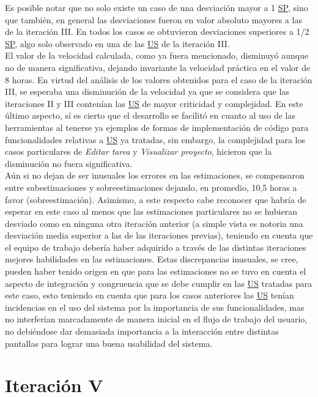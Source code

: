 \documentclass[a4paper, 12pt,twoside]{report}  %
\numberwithin{equation}{subsection} %
\begin{document}
\indent Es posible notar que no solo existe un caso de una desviación mayor a 1 \hyperlink{SP}{SP}, sino que también, en general las desviaciones fueron en valor absoluto mayores a las de la iteración III. En todos los casos se obtuvieron desviaciones superiores a 1/2 \hyperlink{SP}{SP}, algo solo observado en una de las \hyperlink{US}{US} de la iteración III.\\
\indent El valor de la velocidad calculada, como ya fuera mencionado, disminuyó aunque no de manera significativa, dejando invariante la velocidad práctica en el valor de 8 horas. En virtud del análisis de los valores obtenidos para el caso de la iteración III, se esperaba una disminución de la velocidad ya que se considera que las iteraciones II y III contenían las \hyperlink{US}{US} de mayor criticidad y complejidad. En este último aspecto, sí es cierto que el desarrollo se facilitó en cuanto al uso de las herramientas al tenerse ya ejemplos de formas de implementación de código para funcionalidades relativas a \hyperlink{US}{US} ya tratadas, sin embargo, la complejidad para los casos particulares de \textit{Editar tarea} y \textit{Visualizar proyecto}, hicieron que la disminución no fuera significativa.\\
\indent Aún si no dejan de ser inusuales los errores en las estimaciones, se compensaron entre subestimaciones y sobreestimaciones dejando, en promedio, 10,5 horas a favor (sobreestimación). Asimismo, a este respecto cabe reconocer que habría de esperar en este caso al menos que las estimaciones particulares no se hubieran desviado como en ninguna otra iteración anterior (a simple vista es notoria una desviación media superior a las de las iteraciones previas), teniendo en cuenta que el equipo de trabajo debería haber adquirido a través de las distintas iteraciones mejores habilidades en las estimaciones. Estas discrepancias inusuales, se cree, pueden haber tenido origen en que para las estimaciones no se tuvo en cuenta el aspecto de integración y congruencia que se debe cumplir en las \hyperlink{US}{US} tratadas para este caso, esto teniendo en cuenta que para los casos anteriores las \hyperlink{US}{US} tenían incidencias en el uso del sistema por la importancia de sus funcionalidades, mas no interferían marcadamente de manera inicial en el flujo de trabajo del usuario, no debiéndose dar demasiada importancia a la interacción entre distintas pantallas para lograr una buena usabilidad del sistema.

\section{Iteración V}
\label{descripcion_iteracion_V}
\end{document}

